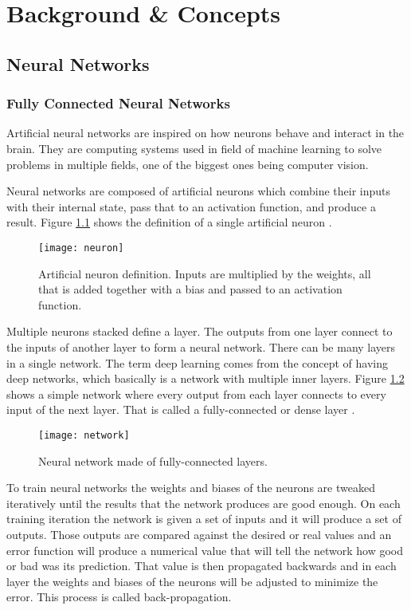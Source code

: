 \chapter{Background \& Concepts}
\label{ch:background}

\section{Neural Networks}

\subsection{Fully Connected Neural Networks}

Artificial neural networks are inspired on how neurons behave and interact in the brain. They are computing systems used in field of machine learning to solve problems in multiple fields, one of the biggest ones being computer vision.

Neural networks are composed of artificial neurons which combine their inputs with their internal state, pass that to an activation function, and produce a result. Figure \ref{fig:neuron} shows the definition of a single artificial neuron \cite{nn_def}.

\begin{figure}[thbp]
	\centering
	\texttt{[image: neuron]}
	\caption{Artificial neuron definition. Inputs are multiplied by the weights, all that is added together with a bias and passed to an activation function.}
	\label{fig:neuron}
\end{figure}

Multiple neurons stacked define a layer. The outputs from one layer connect to the inputs of another layer to form a neural network. There can be many layers in a single network. The term deep learning comes from the concept of having deep networks, which basically is a network with multiple inner layers. Figure \ref{fig:network} shows a simple network where every output from each layer connects to every input of the next layer. That is called a fully-connected or dense layer \cite{intro_cnn}.

\begin{figure}[thbp]
	\centering
	\texttt{[image: network]}
	\caption{Neural network made of fully-connected layers.}
	\label{fig:network}
\end{figure}

To train neural networks the weights and biases of the neurons are tweaked iteratively until the results that the network produces are good enough. On each training iteration the network is given a set of inputs and it will produce a set of outputs. Those outputs are compared against the desired or real values and an error function will produce a numerical value that will tell the network how good or bad was its prediction. That value is then propagated backwards and in each layer the weights and biases of the neurons will be adjusted to minimize the error. This process is called back-propagation.

